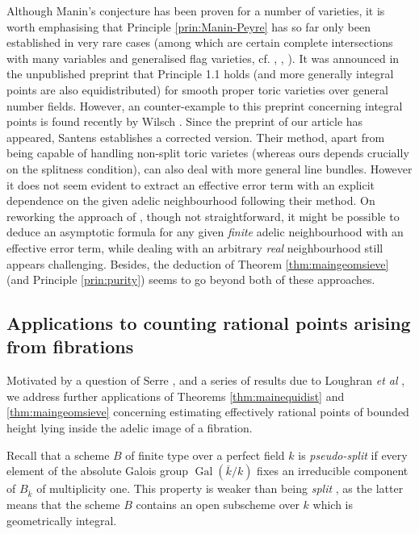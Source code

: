 \documentclass[11pt,letterpaper]{amsart}
\theoremstyle{plain}
\numberwithin{equation}{section}
\theoremstyle{definition}
\theoremstyle{remark}
\begin{document}
Although Manin's conjecture has been proven for a number of varieties, it is worth emphasising that Principle \ref{prin:Manin-Peyre} has so far only been established in very rare cases (among which are certain complete intersections with many variables and generalised flag varieties, cf. \cite{Birch}, \cite[\S3.2 p. 227]{PeyreBeyond}, \cite[\S5--\S6]{Peyre}). It was announced in the unpublished preprint \cite[Theorem 3.10.3]{Chambert-Loir-Tsch} that Principle 1.1 holds (and more generally integral points are also equidistributed) for smooth proper toric varieties over general number fields. However, an counter-example to this preprint concerning integral points is found recently by Wilsch \cite{Wilsch}. Since the preprint of our article has appeared, Santens \cite[p.7~2nd paragraph]{Santens} establishes a corrected version.
Their method, apart from being capable of handling non-split toric varietes (whereas ours depends crucially on the splitness condition), can also deal with more general line bundles. However it does not seem evident to extract an effective error term with an explicit dependence on the given adelic neighbourhood following their method.  On reworking the approach of \cite{Breteche,Breteche2}, though not straightforward, it might be possible to deduce an asymptotic formula for any given \emph{finite} adelic neighbourhood with an effective error term, while dealing with an arbitrary \emph{real} neighbourhood still appears challenging. Besides, the deduction of Theorem \ref{thm:maingeomsieve} (and Principle \ref{prin:purity}) seems to go beyond both of these approaches.
\subsection{Applications to counting rational points arising from fibrations}\label{se:applifibration}
Motivated by a question of Serre \cite{Serre-Br}, and a series of results due to Loughran \emph{et al} \cite{Loughran,BBL,Loughran-Smeets,Browning-Loughran}, we address further applications of Theorems \ref{thm:mainequidist} and \ref{thm:maingeomsieve} concerning estimating effectively rational points of bounded height lying inside the adelic image of a fibration.

Recall that  a scheme $B$ of finite type over a perfect field $k$ is \emph{pseudo-split} \cite[Definition 1.3]{Browning-Loughran} if every element of the absolute Galois group $\operatorname{Gal}(\overline{k}/k)$ fixes an irreducible component of $B_{\overline{k}}$ of multiplicity one. This property is weaker than being \emph{split} \cite[Definition 0.1]{Skorobogatov}, as the latter means that the scheme $B$ contains an open subscheme over $k$ which is geometrically integral.
\end{document}

